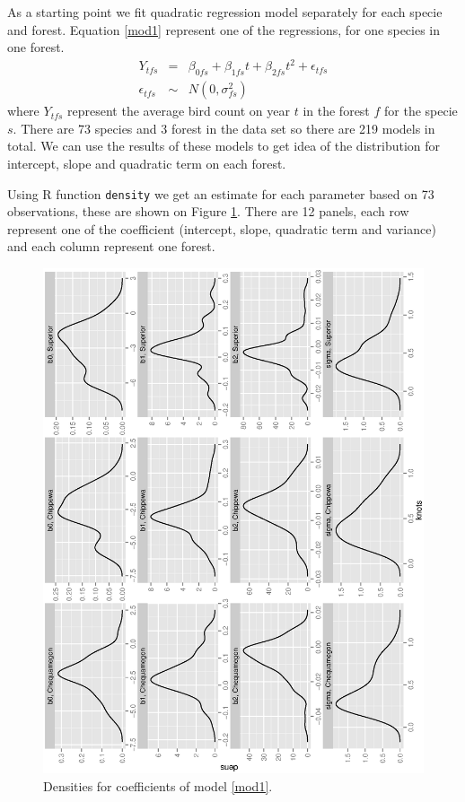\documentclass{article}
\begin{document}
As a starting point we fit quadratic regression model separately for each specie and forest. Equation \ref{mod1} represent one of the regressions, for one species in one forest. 
\begin{eqnarray}
\nonumber Y_{tfs} &=&  \beta_{0fs} + \beta_{1fs}t + \beta_{2fs}t^2 + \epsilon_{tfs}  \\
\epsilon_{tfs} &\sim& N(0,\sigma_{fs}^2)
\label{mod1}
\end{eqnarray}
where $Y_{tfs}$ represent the average bird count on year $t$ in the forest $f$ for the specie $s$. There are 73 species and 3 forest in the data set so there are 219 models in total. We can use the results of these models to get idea of the distribution for intercept, slope and quadratic term on each forest. 

Using R function {\tt density} we get an estimate for each parameter based on 73 observations, these are shown on Figure \ref{histm1}. There are 12 panels, each row represent one of the coefficient (intercept, slope, quadratic term and variance) and each column represent one forest. 
\begin{figure}[h!]
\centering
\includegraphics[scale=.4, angle=-90]{hist_m1.ps}
\caption{Densities for coefficients of model \ref{mod1}. \label{histm1}}
\end{figure}
\end{document}
